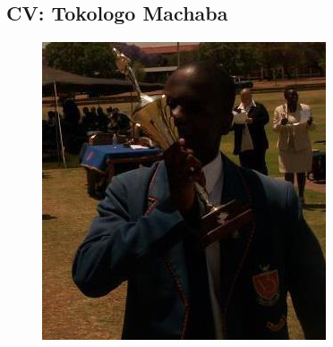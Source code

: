 \documentclass[12pt]{article}
\begin{document}
	\newpage
	\subsection{CV: Tokologo Machaba}
	
	\begin{figure}[ht!]
		\centering
		\includegraphics[scale=0.5]{./Pictures/Carlo.jpg}
	\end{figure}
		
\end{document}
